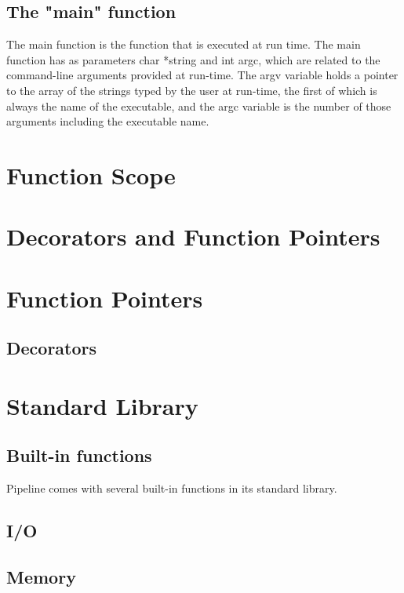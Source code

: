 \documentclass[./LRM_main.tex]{subfiles}
\begin{document}
\subsection{The "main" function}
The main function is the function that is executed at run time. The main function has as parameters char *string and int argc, which are related to the command-line arguments provided at run-time. The argv variable holds a pointer to the array of the strings typed by the user at run-time, the first of which is always the name of the executable, and the argc variable is the number of those arguments including the executable name.
\section{Function Scope}

\section{Decorators and Function Pointers}
\section{Function Pointers}
\subsection{Decorators}
\section{Standard Library}
\subsection{Built-in functions}
Pipeline comes with several built-in functions in its standard library. 


\begin{comment}
sizeof
sprintf
strlen
strcompare
substring
strlen
sprintf
\end{comment}
\subsection{I/O}
\begin{comment}
printf
formatting
verbs
user input
\end{comment}
\subsection{Memory}


\end{document}
